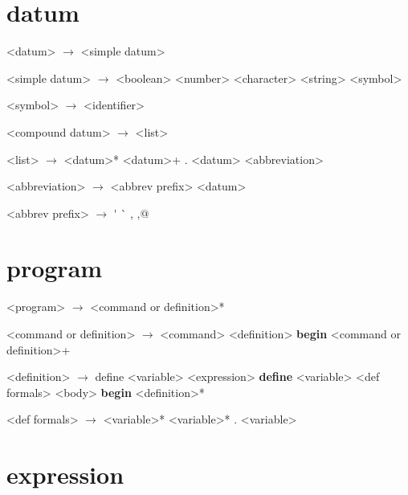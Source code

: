 \documentclass[11pt]{report}
\begin{document}
\section{datum}
\begin{grammar}
  <datum> $\longrightarrow$ <simple datum> 

  <simple datum> $\longrightarrow$ <boolean> \alt <number>
  \alt <character> \alt <string> \alt <symbol>

  <symbol> $\longrightarrow$ <identifier>

  <compound datum> $\longrightarrow$ <list>

  <list> $\longrightarrow$ \bop <datum>* \bcp \alt \bop <datum>+  .  <datum> \bcp
  \alt <abbreviation>

  <abbreviation> $\longrightarrow$ <abbrev prefix> <datum>

  <abbrev prefix> $\longrightarrow$ \'{} \alt \`{} \alt , \alt ,@

\end{grammar}

\section{program}

\begin{grammar}
  <program> $\longrightarrow$ <command or definition>*

  <command or definition> $\longrightarrow$ <command>
  \alt <definition>
  \alt \bop \textbf{begin} <command or definition>+ \bcp

  <definition> $\longrightarrow$ \bop define <variable> <expression> \bcp
  \alt \bop \textbf{define} \bop <variable> <def formals> \bcp <body> \bcp
  \alt \bop \textbf{begin} <definition>* \bcp

  <def formals> $\longrightarrow$ <variable>*
  \alt <variable>*  .  <variable>
\end{grammar}

\section{expression}
\end{document}
